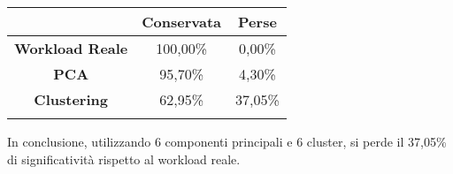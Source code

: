 \vspace{5 mm}

\begin{tabular}{c|c|c|}
 & \textbf{Conservata} & \textbf{Perse} \\
 \hline
 \textbf{Workload Reale} & 100,00\% &	0,00\% \\
 \hline
 \textbf{PCA} &	95,70\%	& 4,30\% \\
 \hline
 \textbf{Clustering} &	62,95\%	& 37,05\% \\
 \hline
 \label{significativita_workload}
\end{tabular}

\vspace{5 mm}

In conclusione, utilizzando 6 componenti principali e 6 cluster, si perde il 37,05\%
di significatività rispetto al workload reale.
